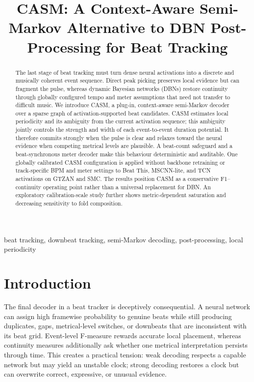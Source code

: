 \documentclass{article}
\title{CASM: A Context-Aware Semi-Markov Alternative to DBN Post-Processing for Beat Tracking}
\begin{document}
\ninept
\maketitle

\begin{abstract}
The last stage of beat tracking must turn dense neural activations into a discrete and musically coherent event sequence. Direct peak picking preserves local evidence but can fragment the pulse, whereas dynamic Bayesian networks (DBNs) restore continuity through globally configured tempo and meter assumptions that need not transfer to difficult music. We introduce CASM, a plug-in, context-aware semi-Markov decoder over a sparse graph of activation-supported beat candidates. CASM estimates local periodicity and its ambiguity from the current activation sequence; this ambiguity jointly controls the strength and width of each event-to-event duration potential. It therefore commits strongly when the pulse is clear and relaxes toward the neural evidence when competing metrical levels are plausible. A beat-count safeguard and a beat-synchronous meter decoder make this behaviour deterministic and auditable. One globally calibrated CASM configuration is applied without backbone retraining or track-specific BPM and meter settings to Beat This, MSCNN-lite, and TCN activations on GTZAN and SMC. The results position CASM as a conservative F1--continuity operating point rather than a universal replacement for DBN. An exploratory calibration-scale study further shows metric-dependent saturation and decreasing sensitivity to fold composition.
\end{abstract}

\begin{keywords}
beat tracking, downbeat tracking, semi-Markov decoding, post-processing, local periodicity
\end{keywords}

\section{Introduction}
\label{sec:intro}

The final decoder in a beat tracker is deceptively consequential. A neural network can assign high framewise probability to genuine beats while still producing duplicates, gaps, metrical-level switches, or downbeats that are inconsistent with its beat grid. Event-level F-measure rewards accurate local placement, whereas continuity measures additionally ask whether one metrical interpretation persists through time. This creates a practical tension: weak decoding respects a capable network but may yield an unstable clock; strong decoding restores a clock but can overwrite correct, expressive, or unusual evidence.
\end{document}
